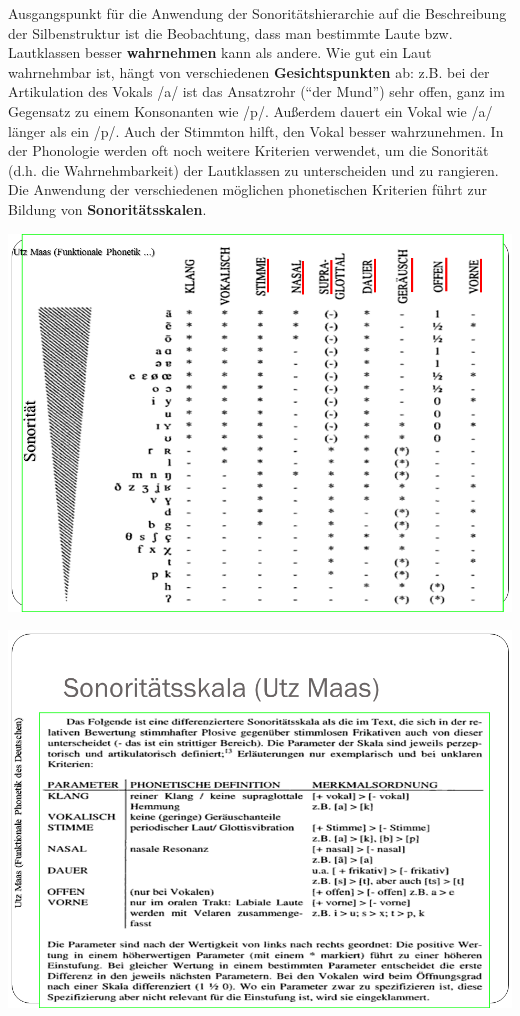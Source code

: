 \documentclass[
  letterpaper,
]{scrbook}
\begin{document}
Ausgangspunkt für die Anwendung der Sonoritätshierarchie auf die
Beschreibung der Silbenstruktur ist die Beobachtung, dass man bestimmte
Laute bzw. Lautklassen besser \textbf{wahrnehmen} kann als andere. Wie
gut ein Laut wahrnehmbar ist, hängt von verschiedenen
\textbf{Gesichtspunkten} ab: z.B. bei der Artikulation des Vokals /a/
ist das Ansatzrohr (``der Mund'') sehr offen, ganz im Gegensatz zu einem
Konsonanten wie /p/. Außerdem dauert ein Vokal wie /a/ länger als ein
/p/. Auch der Stimmton hilft, den Vokal besser wahrzunehmen. In der
Phonologie werden oft noch weitere Kriterien verwendet, um die Sonorität
(d.h. die Wahrnehmbarkeit) der Lautklassen zu unterscheiden und zu
rangieren. Die Anwendung der verschiedenen möglichen phonetischen
Kriterien führt zur Bildung von \textbf{Sonoritätsskalen}.

\includegraphics[width=1\textwidth,height=\textheight]{./pictures/Wagner_Maas_Duden_Petric_4.PNG}

\includegraphics[width=1\textwidth,height=\textheight]{./pictures/Wagner_Maas_Duden_Petric_5.PNG}
\end{document}
